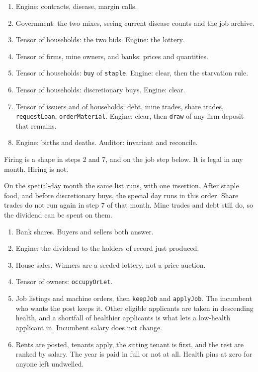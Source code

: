 \documentclass[11pt]{article}
\begin{document}
\begin{enumerate}
\item Engine: contracts, disease, margin calls.
\item Government: the two mixes, seeing current disease counts and the
      job archive.
\item Tensor of households: the two bids. Engine: the lottery.
\item Tensor of firms, mine owners, and banks: prices and quantities.
\item Tensor of households: \texttt{buy} of \texttt{staple}. Engine: clear,
      then the starvation rule.
\item Tensor of households: discretionary buys. Engine: clear.
\item Tensor of issuers and of households: debt, mine trades, share trades,
      \texttt{requestLoan}, \texttt{orderMaterial}. Engine: clear, then
      \texttt{draw} of any firm deposit that remains.
\item Engine: births and deaths. Auditor: invariant and reconcile.
\end{enumerate}

Firing is a shape in steps 2 and 7, and on the job step below. It is legal
in any month. Hiring is not.

On the special-day month the same list runs, with one insertion. After
staple food, and before discretionary buys, the special day runs in this
order. Share trades do not run again in step 7 of that month. Mine trades
and debt still do, so the dividend can be spent on them.

\begin{enumerate}
\item Bank shares. Buyers and sellers both answer.
\item Engine: the dividend to the holders of record just produced.
\item House sales. Winners are a seeded lottery, not a price auction.
\item Tensor of owners: \texttt{occupyOrLet}.
\item Job listings and machine orders, then \texttt{keepJob} and
      \texttt{applyJob}. The incumbent who wants the post keeps it.
      Other eligible applicants are taken in descending health, and a
      shortfall of healthier applicants is what lets a low-health applicant
      in. Incumbent salary does not change.
\item Rents are posted, tenants apply, the sitting tenant is first, and the
      rest are ranked by salary. The year is paid in full or not at all.
      Health pins at zero for anyone left undwelled.
\end{enumerate}
\end{document}
